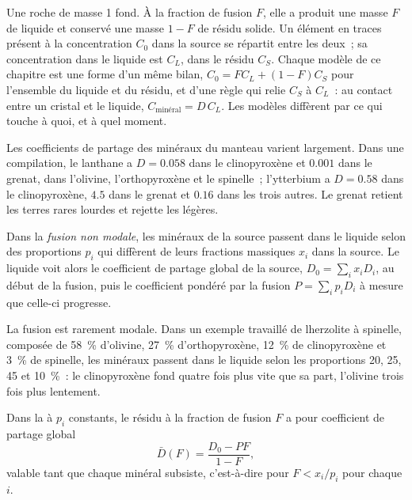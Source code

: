 Une roche de masse 1 fond. À la fraction de fusion $F$, elle a produit une masse $F$ de
liquide et conservé une masse $1 - F$ de résidu solide. Un élément en traces présent à la
concentration $C_0$ dans la source se répartit entre les deux~; sa concentration
dans le liquide est $C_L$, dans le résidu $C_S$. Chaque modèle de ce chapitre est une
forme d'un même bilan, $C_0 = FC_L + (1 - F)C_S$ pour l'ensemble du liquide et du résidu,
et d'une règle qui relie $C_S$ à $C_L$~: au contact entre un cristal et
le liquide, $C_{\text{minéral}} = D\,C_L$. Les modèles diffèrent par ce qui touche
à quoi, et à quel moment.

Les coefficients de partage des minéraux du manteau varient largement. Dans une
compilation, le lanthane a $D = 0.058$ dans le clinopyroxène et $0.001$
dans le grenat, dans l'olivine, l'orthopyroxène et le spinelle~; l'ytterbium a $D = 0.58$
dans le clinopyroxène, $4.5$ dans le grenat et $0.16$ dans les trois autres. Le grenat retient les
terres rares lourdes et rejette les légères.

\begin{definition}\label{def:b3:trace-element-modelling:nonmodal}
Dans la \emph{fusion non modale}, les minéraux de la
source passent dans le liquide selon des proportions $p_i$ qui diffèrent de leurs fractions
massiques $x_i$ dans la source. Le liquide voit alors le coefficient de partage global
de la source, $D_0 = \sum_i x_iD_i$, au début de la fusion, puis le
coefficient pondéré par la fusion $P = \sum_i p_iD_i$ à mesure que celle-ci progresse.
\end{definition}

La fusion est rarement modale. Dans un exemple travaillé de lherzolite à spinelle, composée de
\qty{58}{\percent} d'olivine, \qty{27}{\percent} d'orthopyroxène,
\qty{12}{\percent} de clinopyroxène et \qty{3}{\percent} de spinelle, les minéraux
passent dans le liquide selon les proportions 20, 25, 45 et \qty{10}{\percent}~:
le clinopyroxène fond quatre fois plus vite que sa part, l'olivine trois fois
plus lentement.

\begin{proposition}
\label{prop:b3:trace-element-modelling:residue}
Dans la  à $p_i$ constants, le résidu à la fraction de fusion $F$
a pour coefficient de partage global
\[
\bar D(F) = \frac{D_0 - PF}{1 - F},
\]
valable tant que chaque minéral subsiste, c'est-à-dire pour $F < x_i/p_i$ pour chaque $i$.
\end{proposition}

